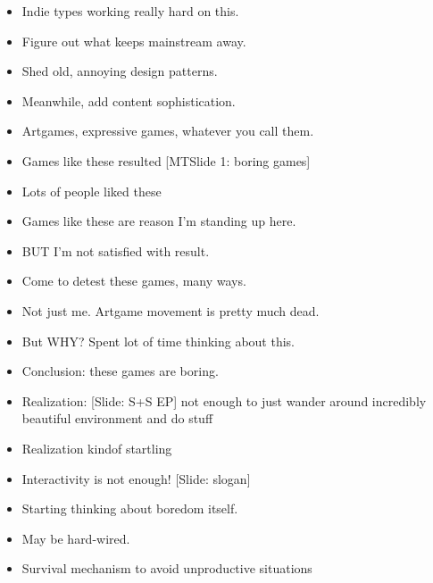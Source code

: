 \documentclass[12pt]{article}
\begin{document}
{\begin{itemize}
\item Indie types working really hard on this.

\item Figure out what keeps mainstream away.

\item Shed old, annoying design patterns.

\item Meanwhile, add content sophistication.

\item Artgames, expressive games, whatever you call them.

\item Games like these resulted [MTSlide 1:  boring games]


\item Lots of people liked these

\item Games like these are reason I'm standing up here.

\item BUT I'm not satisfied with result.  

\item Come to detest these games, many ways.

\item Not just me.  Artgame movement is pretty much dead.

\item But WHY?  Spent lot of time thinking about this.

\item Conclusion:  these games are boring.

\item Realization: [Slide:  S+S EP] not enough to just wander around incredibly beautiful environment and do stuff

\item Realization kindof startling

\item Interactivity is not enough!  [Slide:  slogan]



\item Starting thinking about boredom itself.

\item May be hard-wired.

\item Survival mechanism to avoid unproductive situations

\end{itemize}

}
\end{document}
